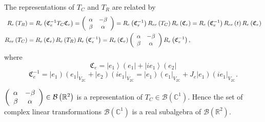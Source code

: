 \documentclass[aps,preprint]{revtex4}%
\begin{document}
The representations of $T_{C}$ and $T_{R}$ are related by
\begin{align}
R_{e}\left(  T_{R}\right)   &  =R_{e}\left(  \mathfrak{C}_{e}^{-1}%
T_{C}\mathfrak{C}_{e}\right)  =\left(
\begin{array}
[c]{cc}%
\alpha & -\beta\\
\beta & \alpha
\end{array}
\right)  =R_{e}\left(  \mathfrak{C}_{e}^{-1}\right)  R_{ee}\left(
T_{C}\right)  R_{e}\left(  \mathfrak{C}_{e}\right)  =R_{e}\left(
\mathfrak{C}_{e}^{-1}\right)  R_{ee}\left(  t\right)  R_{e}\left(
\mathfrak{C}_{e}\right) \\
R_{ee}\left(  T_{C}\right)   &  =R_{e}\left(  \mathfrak{C}_{e}\right)
R_{e}\left(  T_{R}\right)  R_{e}\left(  \mathfrak{C}_{e}^{-1}\right)
=R_{e}\left(  \mathfrak{C}_{e}\right)  \left(
\begin{array}
[c]{cc}%
\alpha & -\beta\\
\beta & \alpha
\end{array}
\right)  R_{e}\left(  \mathfrak{C}_{e}^{-1}\right)  ,
\end{align}
where
\begin{equation}
\mathfrak{C}_{e}=\left\vert e_{1}\right\rangle \left(  e_{1}\right\vert
+\left\vert ie_{1}\right\rangle \left(  e_{2}\right\vert
\end{equation}%
\begin{equation}
\mathfrak{C}_{e}^{-1}=\left\vert e_{1}\right)  \left(  e_{1}\right\vert
_{V_{2\mathbb{C}}}+\left\vert e_{2}\right)  \left(  ie_{1}\right\vert
_{V_{2\mathbb{C}}}=\left\vert e_{1}\right)  \left(  e_{1}\right\vert
_{V_{2\mathbb{C}}}+J_{e}\left\vert e_{1}\right)  \left(  ie_{1}\right\vert
_{V_{2\mathbb{C}}}.
\end{equation}


$\left(
\begin{array}
[c]{cc}%
\alpha & -\beta\\
\beta & \alpha
\end{array}
\right)  \in\mathcal{B}\left(  \mathbb{R}^{2}\right)  $ is a representation of
$T_{C}\in\mathcal{B}\left(  \mathbb{C}^{1}\right)  .$ Hence the set of complex
linear transformations $\mathcal{B}\left(  \mathbb{C}^{1}\right)  $ is a real
subalgebra of $\mathcal{B}\left(  \mathbb{R}^{2}\right)  .$
\end{document}
